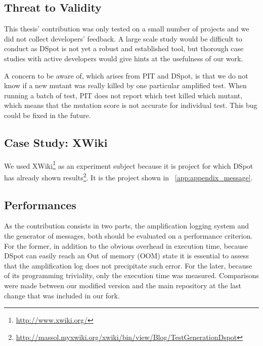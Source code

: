 \documentclass[a4paper,11pt]{sdm_internship}
\newcommand{\dspot}{DSpot\xspace}
\theoremstyle{definition}
\begin{document}
\subsection{Threat to Validity}%
\label{ssec:threat_to_validity}
This thesis' contribution was only tested on a small number of projects and we did not collect developers' feedback.
A large scale study would be difficult to conduct as \dspot{} is not yet a robust and established tool, but thorough case studies with active developers would give hints at the usefulness of our work.

A concern to be aware of, which arises from PIT and \dspot{}, is that we do not know if a new mutant was really killed by one particular amplified test.
When running a batch of test, PIT does not report which test killed which mutant, which means that the mutation score is not accurate for individual test.
This bug could be fixed in the future.

\subsection{Case Study: XWiki}%
\label{ssec:case_studies}
We used XWiki\footnote{\url{http://www.xwiki.org/}} as an experiment subject because it is project for which DSpot has already shown results\footnote{\url{http://massol.myxwiki.org/xwiki/bin/view/Blog/TestGenerationDspot}}.
It is the project shown in \appendixname~\ref{app:appendix_message}.

\subsection{Performances}%
\label{ssec:performances}
As the contribution consists in two parts, the amplification logging system and the generator of messages, both should be evaluated on a performance criterion.
For the former, in addition to the obvious overhead in execution time, because \dspot{} can easily reach an Out of memory (OOM) state it is essential to assess that the amplification log does not precipitate such error.
For the later, because of its programming triviality, only the execution time was measured.
Comparisons were made between our modified version and the main repository at the last change that was included in our fork.
\end{document}
